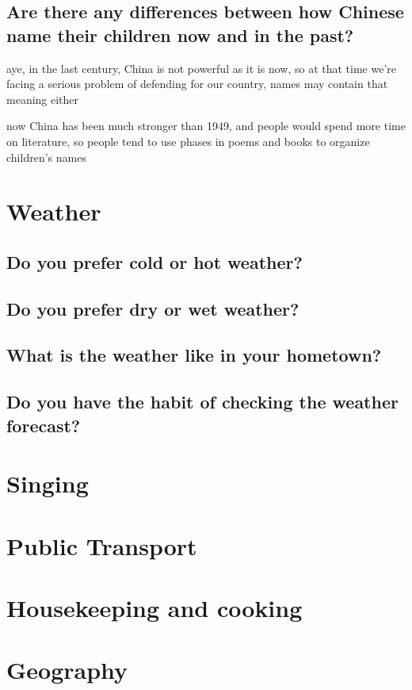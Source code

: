 \documentclass[conference]{IEEEtran}
\begin{document}
\subsection{Are there any differences between how Chinese name their
children now and in the past?}
aye, in the last century, China is not powerful as it is now, so at that time
we're facing a serious problem of defending for our country, names may contain
that meaning either

now China has been much stronger than 1949, and people would spend more time
on literature, so people tend to use phases in poems and books to 
organize children's names

\section{Weather}
\subsection{Do you prefer cold or hot weather?}

\subsection{Do you prefer dry or wet weather?}
\subsection{What is the weather like in your hometown?}
\subsection{Do you have the habit of checking the weather forecast?}

\section{Singing}

\section{Public Transport}

\section{Housekeeping and cooking}

\section{Geography}
\end{document}
